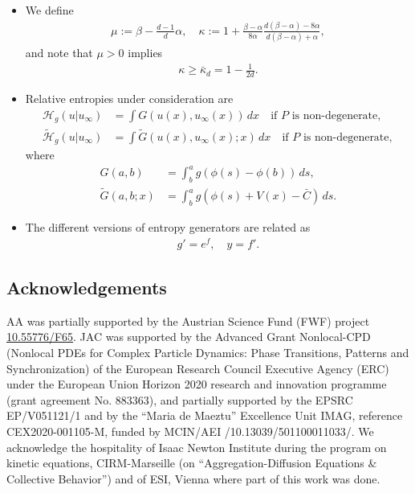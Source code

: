 \documentclass[reqno]{amsart}
\begin{document}
\begin{itemize}
\begin{align*}
  \end{align*}
  Note that $\tilde\xi - \xi = V-\phi(u_\infty) = \bar C$ if $P$ is non-degenerate,
  and that the evolution equation becomes
  \begin{align*}
    \partial_tu = \nabla\cdot(u\nabla\tilde\xi) .
  \end{align*}
\item We define
  \begin{align*}
    \mu := \beta-\frac{d-1}d \alpha,\quad
    \kappa := 1+\frac{\beta-\alpha}{8\alpha}\frac{d(\beta-\alpha)-8\alpha}{d(\beta-\alpha)+\alpha},
  \end{align*}
  and note that $\mu>0$ implies
  \begin{align*}
    \kappa \ge \bar\kappa_d = 1-\frac1{2d}.
  \end{align*}
\item Relative entropies under consideration are
  \begin{align*}
    \mathcal{H}_g(u|u_\infty) &= \int G(u(x),u_\infty(x))\,dx
                                \quad \text{if $P$ is non-degenerate}, \\
    \tilde{\mathcal{H}}_g(u|u_\infty) &= \int\tilde G(u(x),u_\infty(x);x)\,dx
                                \quad \text{if $P$ is non-degenerate},    
  \end{align*}
  where 
  \begin{align*}
    G(a,b) &= \int_b^a g(\phi(s)-\phi(b)) \, ds,\\
    \tilde G(a,b;x) &= \int_b^a g(\phi(s)+V(x)-\bar C) \, ds. 
  \end{align*}  
\item The different versions of entropy generators are related as
  \begin{align*}
    g' = e^f, \quad y = f'.
  \end{align*}
\end{itemize}

\bigskip
\subsection*{Acknowledgements}
AA was partially supported by the Austrian Science Fund (FWF) project \href{https://doi.org/10.55776/F65}{10.55776/F65}.
JAC was supported by the Advanced Grant Nonlocal-CPD (Nonlocal PDEs for Complex Particle Dynamics: Phase Transitions, Patterns and Synchronization) of the European Research Council Executive Agency (ERC) under the European Union Horizon 2020 research and innovation programme (grant agreement No. 883363), and partially supported by the EPSRC EP/V051121/1 and by the ``Maria de Maeztu'' Excellence Unit IMAG, reference CEX2020-001105-M, funded by MCIN\slash AEI \slash10.13039\slash501100011033\slash. We acknowledge the hospitality of Isaac Newton Institute during the program on kinetic equations, CIRM-Marseille (on ``Aggregation-Diffusion Equations \& Collective Behavior'') and of ESI, Vienna where part of this work was done. 

 





\end{document}
